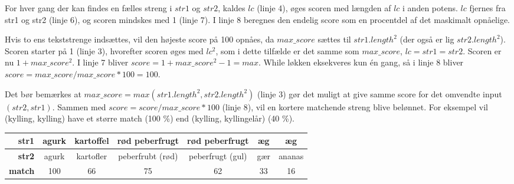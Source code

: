 For hver gang der kan findes en fælles streng i $str1$ og $str2$, kaldes $lc$ (linje 4), øges scoren med længden af $lc$ i anden potens. $lc$ fjernes fra str1 og str2 (linje 6), og scoren mindskes med 1 (linje 7). I linje 8 beregnes den endelig score som en procentdel af det maskimalt opnåelige.

Hvis to ens tekststrenge indsættes, vil den højeste score på 100 opnåes, da $max\_score$ sættes til $str1.length^2$ (der også er lig $str2.length^2$). Scoren starter på 1 (linje 3), hvorefter scoren øges med $lc^2$, som i dette tilfælde er det samme som $max\_score$, $lc = str1 = str2$. Scoren er nu $1 + max\_score^2$. I linje 7 bliver $score = 1 + max\_score^2 - 1 = max$. While løkken eksekveres kun én gang, så i linje 8 bliver $score = max\_score / max\_score * 100 = 100$.

Det bør bemærkes at $max\_score = max(str1.length^2, str2.length^2)$ (linje 3) gør det muligt at give samme score for det omvendte input $(str2, str1)$. Sammen med $score = score / max\_score * 100$ (linje 8), vil en kortere matchende streng blive belønnet. For eksempel vil (kylling, kylling)  have et større match (100 \%) end (kylling, kyllingelår) (40 \%).

\begin{table}[H]
\centering
\begin{tabular}{| r | c | c | c | c | c | c |}
\hline
\textbf{str1}  & agurk & kartoffel & rød peberfrugt   & rød peberfrugt   & æg  & æg  \\ \hline
\textbf{str2}  & agurk & kartofler & peberfrubt (rød) & peberfrugt (gul) & gær & ananas  \\ \hline
\textbf{match} & 100   &     66    &       75         &       62         & 33  & 16 \\ \hline
\end{tabular}
\label{table:testparse}
\end{table}


